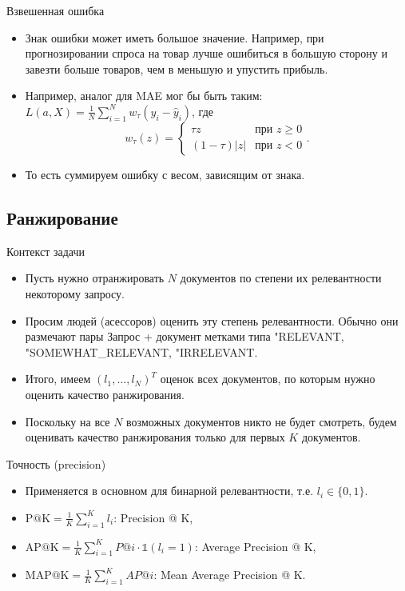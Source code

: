 \documentclass[9pt]{beamer}
\begin{document}
\begin{frame}{Взвешенная ошибка}
    \begin{itemize}
        \item Знак ошибки может иметь большое значение. Например, при прогнозировании спроса на товар лучше ошибиться в большую сторону и завезти больше товаров, чем в меньшую и упустить прибыль.
        \item Например, аналог для MAE мог бы быть таким: $L(a, X) = \frac{1}{N}\sum\limits_{i=1}^N w_\tau(y_i - \hat y_i)$, где
    $$w_\tau(z) = \begin{cases}\tau z & \text{при } z \geq 0\\ (1-\tau)|z| & \text{при } z <0\end{cases}.$$
    \item То есть суммируем ошибку с весом, зависящим от знака.
    \end{itemize}
\end{frame}

\subsection{Ранжирование}
\begin{frame}{Контекст задачи}
    \begin{itemize}
        \item Пусть нужно отранжировать $N$ документов по степени их релевантности некоторому запросу.
        \item Просим людей (асессоров) оценить эту степень релевантности. Обычно они размечают пары Запрос + документ метками типа "RELEVANT\textquotedbl, "SOMEWHAT\_RELEVANT\textquotedbl, "IRRELEVANT\textquotedbl.
        \item Итого, имеем $(l_1,\ldots, l_N)^T$ оценок всех документов, по которым нужно оценить качество ранжирования.
        \item Поскольку на все $N$ возможных документов никто не будет смотреть, будем оценивать качество ранжирования только для первых $K$ документов.
    \end{itemize}
\end{frame}

\begin{frame}{Точность (precision)}
    \begin{itemize}
        \item Применяется в основном для бинарной релевантности, т.е. $l_i\in \{0, 1\}$.
        \item $\text{P@K} = \frac{1}{K}\sum_{i=1}^K l_i$: Precision @ K,
        \item $\text{AP@K} = \frac{1}{K}\sum_{i=1}^K P@i\cdot \mathds{1}(l_i = 1)$: Average Precision @ K,
        \item $\text{MAP@K} = \frac{1}{K}\sum_{i=1}^K AP@i$: Mean Average Precision @ K.
    \end{itemize}
\end{frame}
\end{document}
